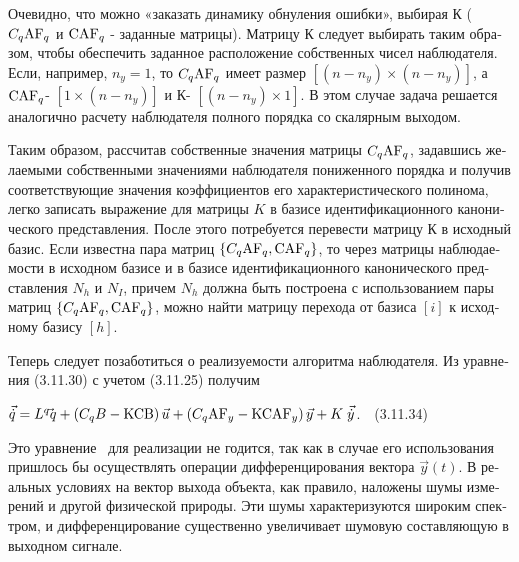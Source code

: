 \documentclass[a4paper]{article}
\newcommand\normalsubformula[1]{\text{\mathversion{normal}$#1$}}
\begin{document}
\bigskip


\bigskip

{\begin{russian}\sffamily
Очевидно, что можно «заказать динамику обнуления ошибки», вы­бирая  $К$ ( $C_q\normalsubformula{\text{AF}}_q$ и 
$\normalsubformula{\text{CAF}}_q$ - заданные матрицы). Матрицу  $К$ следует выбирать таким образом, чтобы обеспечить
заданное расположение собственных чисел наблюдателя. Если, например,  $n_y=1$, то  $C_q\normalsubformula{\text{AF}}_q$
имеет размер  $\left[\left(n-n_y\right)\times \left(n-n_y\right)\right]$, а  $\normalsubformula{\text{CAF}}_q$- 
$\left[1\times \left(n-n_y\right)\right]$ и  $К$-  $\left[\left(n-n_y\right)\times 1\right]$. В этом случае задача
решается аналогично расчету наблюдателя полного порядка со скалярным выходом.
\end{russian}}

{\begin{russian}\sffamily
Таким образом, рассчитав собственные значения матрицы  $C_q\normalsubformula{\text{AF}}_q$, задавшись желаемыми
собственными значениями наблюдателя пониженного порядка и получив соответствующие значения коэффициентов его
характеристического полинома, легко записать выражение для матрицы  $K$ в базисе идентификационного канонического
представления. После этого потребуется перевести матрицу  $К$ в исходный базис. Если известна пара матриц 
$\left\{C_q\normalsubformula{\text{AF}}_q,\normalsubformula{\text{CAF}}_q\right\}$, то через матрицы наблюдаемости в
исходном базисе и в базисе идентификационного канонического представления  $N_h$ и  $N_I$, причем  $N_h$ должна быть
построена с использованием пары матриц 
$\left\{C_q\normalsubformula{\text{AF}}_q,\normalsubformula{\text{CAF}}_q\right\}$, можно найти матрицу перехода от
базиса  $[i]$ к исходному базису  $[h]$.
\end{russian}}

{\begin{russian}\sffamily
Теперь следует позаботиться о реализуемости алгоритма наблюдателя. Из уравнения (3.11.30) с учетом (3.11.25) получим
\ \ 
\end{russian}}

{\begin{russian}\sffamily
 $\vec{\dot q}=L^q\vec{}q+\left(C_qB-\normalsubformula{\text{KCB}}\right)\vec
u+\left(C_q\normalsubformula{\text{AF}}_y-\normalsubformula{\text{KCAF}}_y\right)\vec y+K\;\vec{\dot y}$.\ \ (3.11.34)
\end{russian}}

{\begin{russian}\sffamily
Это уравнение \ для реализации не годится, так как в случае его использования пришлось бы осуществлять операции
дифференцирования вектора  $\vec y(t)$. В реальных условиях на вектор выхода объекта, как правило, наложены шумы
измерений и другой физической природы. Эти шумы характеризуются широким спектром, и дифференцирование существенно
увеличивает шумовую составляющую в выходном сигнале.
\end{russian}}
\end{document}
